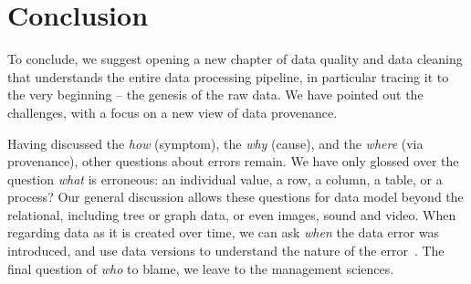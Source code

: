 \section{Conclusion}
\label{sec:conc}

To conclude, we suggest opening a new chapter of data quality and data cleaning that understands the entire data processing pipeline, in particular tracing it to the very beginning -- the genesis of the raw data. We have pointed out the challenges, with a focus on a new view of data provenance. 

Having discussed the \emph{how} (symptom), the \emph{why} (cause), and the \emph{where} (via provenance), other questions about errors remain. We have only glossed over the question \emph{what} is erroneous: an individual value, a row, a column, a table, or a process? Our general discussion allows these questions for data model beyond the relational, including tree or graph data, or even images, sound and video. When regarding data as it is created over time, we can ask \emph{when} the data error was introduced, and use data versions to understand the nature of the error~\cite{bleifuss2018exploringchange}. The final question of \emph{who} to blame, we leave to the management sciences.




